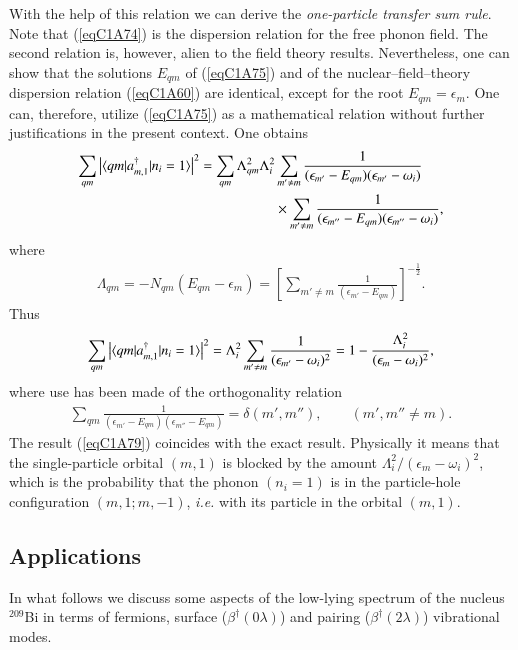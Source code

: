 With the help of this relation we can derive the\textit{ one-particle transfer sum rule}. Note that (\ref{eqC1A74}) is the dispersion relation for the free phonon field. The second relation is, however, alien to the field theory results. Nevertheless, one can show that the solutions $E_{qm}$ of (\ref{eqC1A75}) and of the nuclear--field--theory dispersion relation (\ref{eqC1A60}) are identical, except for the root $E_{qm}=\epsilon_m$. One can, therefore, utilize (\ref{eqC1A75}) as a mathematical relation without further justifications in the 
present context. One obtains 
  \begin{align}\label{eqC1A77} 
   \nonumber \sum_{qm}\left|\langle {qm|a^\dagger_{m,1}|n_i=1} \rangle\right|^2=\sum_{qm}\Lambda_{qm}^2\Lambda_i^2& \sum_{m'\neq m}\frac{1}{(\epsilon_{m'}-E_{qm})(\epsilon_{m'}-\omega_i)}\\
   &\times \sum_{m'\neq m}\frac{1}{(\epsilon_{m''}-E_{qm})(\epsilon_{m''}-\omega_i)},
    \end{align} 
where
  \begin{align}\label{eqC1A78} 
   \Lambda_{qm}=-N_{qm}(E_{qm}-\epsilon_m)=\left[\sum_{m'\neq m}\frac{1}{(\epsilon_{m'}-E_{qm})}\right]^{-\frac{1}{2}}.
    \end{align} 
    Thus
      \begin{align}\label{eqC1A79} 
 \sum_{qm}\left|\langle {qm|a^\dagger_{m,1}|n_i=1} \rangle\right|^2=\Lambda_i^2\sum_{m'\neq m}\frac{1}{(\epsilon_{m'}-\omega_i)^2}=1-\frac{\Lambda^2_i}{(\epsilon_m-\omega_i)^2},     
        \end{align} 
where use has been made of the orthogonality relation 
  \begin{align}\label{eqC1A80} 
\sum_{qm}\frac{1}{(\epsilon_{m'}-E_{qm})(\epsilon_{m''}-E_{qm})}=\delta(m',m''),\qquad (m',m''\neq m).
    \end{align}  
The result (\ref{eqC1A79}) coincides with the exact result. Physically it means that the single-particle orbital $(m, 1)$ is blocked by the amount $\Lambda_i^2/(\epsilon_m-\omega_i)^2$, which is the probability that the phonon $(n_i= 1)$ is in the particle-hole configuration $(m,1;m,-1)$, \textit{i.e.} with its particle in the orbital $(m,1)$. 
\subsection{Applications}\label{Sect1.7.4}
In what follows we discuss some aspects of the low-lying spectrum of the nucleus $^{209}$Bi in terms of fermions, surface ($\beta^\dagger(0\lambda)$) and pairing ($\beta^\dagger(2\lambda)$) vibrational modes. 

